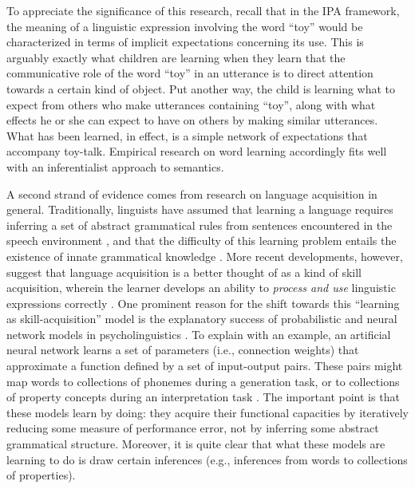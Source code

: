 To appreciate the significance of this research, recall that in the IPA framework, the meaning of a linguistic expression involving the word ``toy'' would be characterized in terms of implicit expectations concerning its use. This is arguably exactly what children are learning when they learn that the communicative role of the word ``toy'' in an utterance is to direct attention towards a certain kind of object. Put another way, the child is learning what to expect from others who make utterances containing ``toy'', along with what effects he or she can expect to have on others by making similar utterances. What has been learned, in effect, is a simple network of expectations that accompany toy-talk. Empirical research on word learning accordingly fits well with an inferentialist approach to semantics. 

A second strand of evidence comes from research on language acquisition in general. Traditionally, linguists have assumed that learning a language requires inferring a set of abstract grammatical rules from sentences encountered in the speech environment \citep{Harley:2014,Pinker:1994,Seidenberg:1997}, and that the difficulty of this learning problem entails the existence of innate grammatical knowledge \citep{Harley:2014,Seidenberg:1997,Chomsky:1990}. More recent developments, however, suggest that language acquisition is a better thought of as a kind of skill acquisition, wherein the learner develops an ability to \textit{process and use} linguistic expressions correctly \citep{Christiansen:2015,Seidenberg:1997}. One prominent reason for the shift towards this ``learning as skill-acquisition'' model is the explanatory success of probabilistic and neural network models in psycholinguistics \citep{Seidenberg:1997}. To explain with an example, an artificial neural network learns a set of parameters (i.e., connection weights) that approximate a function defined by a set of input-output pairs. These pairs might map words to collections of phonemes during a generation task, or to collections of property concepts during an interpretation task \citep[see, e.g.,][]{McClelland:2010}. The important point is that these models learn by doing: they acquire their functional capacities by iteratively reducing some measure of performance error, not by inferring some abstract grammatical structure. Moreover, it is quite clear that what these models are learning to do is draw certain inferences (e.g., inferences from words to collections of properties). 

